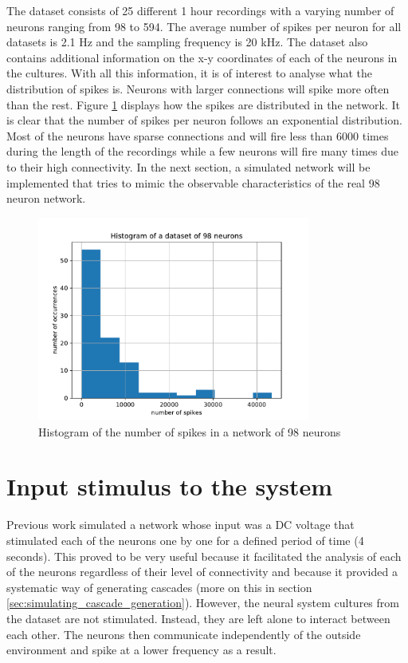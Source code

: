 The dataset consists of 25 different 1 hour recordings with a varying number of neurons ranging from 98 to 594. The average number of spikes per neuron for all datasets is 2.1 Hz and the sampling frequency is 20 kHz. The dataset also contains additional information on the x-y coordinates of each of the neurons in the cultures. With all this information, it is of interest to analyse what the distribution of spikes is. Neurons with larger connections will spike more often than the rest. Figure \ref{fig:histogram_spikes} displays how the spikes are distributed in the network. It is clear that the number of spikes per neuron follows an exponential distribution. Most of the neurons have sparse connections and will fire less than 6000 times during the length of the recordings while a few neurons will fire many times due to their high connectivity. In the next section, a simulated network will be implemented that tries to mimic the observable characteristics of the real 98 neuron network.\\

\begin{figure}[H]
	\centering
	\includegraphics[width=0.8\textwidth]{histogram_number_spikes_dataset.pdf}
	\caption{Histogram of the number of spikes in a network of 98 neurons}
	\label{fig:histogram_spikes}
\end{figure}

\section{Input stimulus to the system}

Previous work \cite{alexandru2018estimating} simulated a network whose input was a DC voltage that stimulated each of the neurons one by one for a defined period of time (4 seconds). This proved to be very useful because it facilitated the analysis of each of the neurons regardless of their level of connectivity and because it provided a systematic way of generating cascades (more on this in section \ref{sec:simulating_cascade_generation}).
However, the neural system cultures from the dataset are not stimulated. Instead, they are left alone to interact between each other. The neurons then communicate independently of the outside environment and spike at a lower frequency as a result. \\

